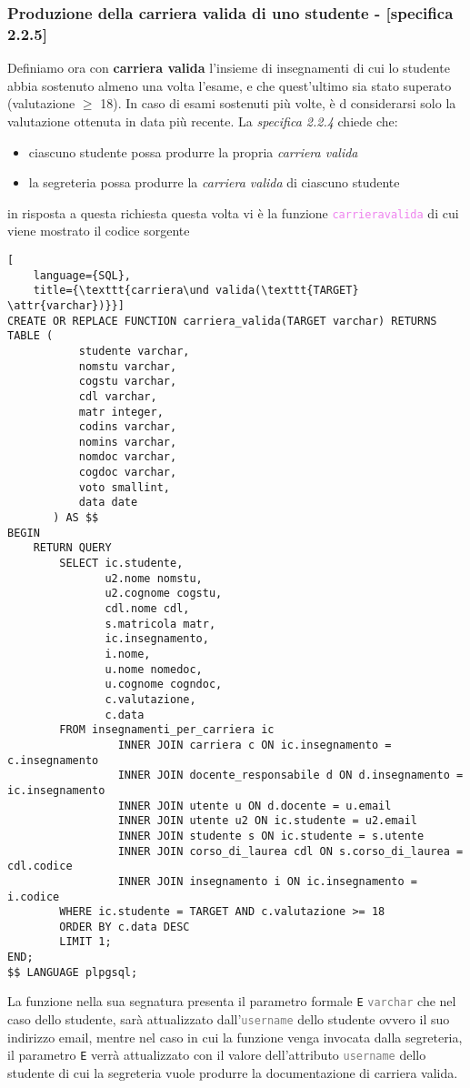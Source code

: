 \documentclass{article}
\newcommand{\attr}[1]{\texttt{\textcolor{gray}{#1}}}
\newcommand{\sqlfunc}[1]{\texttt{\textcolor{violet}{#1}}}
\newcommand{\und}[0]{\textunderscore}
\begin{document}
\subsubsection{Produzione della carriera valida di uno studente - [specifica 2.2.5]}
Definiamo ora con \textbf{carriera valida} l'insieme di insegnamenti di cui lo studente abbia sostenuto almeno una volta l'esame, e che quest'ultimo sia stato superato (valutazione $\geq$ 18). In caso di esami sostenuti più volte, è d considerarsi solo la valutazione ottenuta in data più recente.
La \textit{specifica 2.2.4} chiede che:
\begin{itemize}
    \item ciascuno studente possa produrre la propria \textit{carriera valida}
    \item la segreteria possa produrre la \textit{carriera valida} di ciascuno studente
\end{itemize}
in risposta a questa richiesta questa volta vi è la funzione \sqlfunc{carriera\und valida} di cui viene mostrato il codice sorgente
\begin{lstlisting}[
    language={SQL},
    title={\texttt{carriera\und valida(\texttt{TARGET} \attr{varchar})}}]
CREATE OR REPLACE FUNCTION carriera_valida(TARGET varchar) RETURNS TABLE (
           studente varchar,
           nomstu varchar,
           cogstu varchar,
           cdl varchar,
           matr integer,
           codins varchar,
           nomins varchar,
           nomdoc varchar,
           cogdoc varchar,
           voto smallint,
           data date
       ) AS $$
BEGIN
    RETURN QUERY
        SELECT ic.studente,
               u2.nome nomstu,
               u2.cognome cogstu,
               cdl.nome cdl,
               s.matricola matr,
               ic.insegnamento,
               i.nome,
               u.nome nomedoc,
               u.cognome cogndoc,
               c.valutazione,
               c.data
        FROM insegnamenti_per_carriera ic
                 INNER JOIN carriera c ON ic.insegnamento = c.insegnamento
                 INNER JOIN docente_responsabile d ON d.insegnamento = ic.insegnamento
                 INNER JOIN utente u ON d.docente = u.email
                 INNER JOIN utente u2 ON ic.studente = u2.email
                 INNER JOIN studente s ON ic.studente = s.utente
                 INNER JOIN corso_di_laurea cdl ON s.corso_di_laurea = cdl.codice
                 INNER JOIN insegnamento i ON ic.insegnamento = i.codice
        WHERE ic.studente = TARGET AND c.valutazione >= 18
        ORDER BY c.data DESC
        LIMIT 1;
END;
$$ LANGUAGE plpgsql;
\end{lstlisting}
La funzione nella sua segnatura presenta il parametro formale \texttt{E} \attr{varchar} che nel caso dello studente, sarà attualizzato dall'\attr{username} dello studente ovvero il suo indirizzo email, mentre nel caso in cui la funzione venga invocata dalla segreteria, il parametro \texttt{E} verrà attualizzato con il valore dell'attributo \attr{username} dello studente di cui la segreteria vuole produrre la documentazione di carriera valida.
\end{document}

